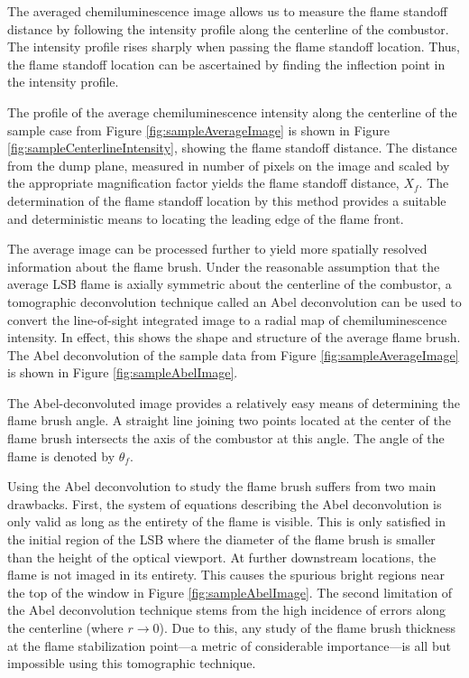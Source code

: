 The averaged chemiluminescence image allows us to measure the flame standoff distance by following the intensity profile along the centerline of the combustor.
The intensity profile rises sharply when passing the flame standoff location.
Thus, the flame standoff location can be ascertained by finding the inflection point in the intensity profile.

The profile of the average chemiluminescence intensity along the centerline of the sample case from Figure \ref{fig:sampleAverageImage} is shown in Figure \ref{fig:sampleCenterlineIntensity}, showing the flame standoff distance.
The distance from the dump plane, measured in number of pixels on the image and scaled by the appropriate magnification factor yields the flame standoff distance, \(X_f\).
The determination of the flame standoff location by this method provides a suitable and deterministic means to locating the leading edge of the flame front.

The average image can be processed further to yield more spatially resolved information about the flame brush.
Under the reasonable assumption that the average LSB flame is axially symmetric about the centerline of the combustor, a tomographic deconvolution technique called an Abel deconvolution\cite{1992-dasch} can be used to convert the line-of-sight integrated image to a radial map of chemiluminescence intensity.
In effect, this shows the shape and structure of the average flame brush.
The Abel deconvolution of the sample data from Figure \ref{fig:sampleAverageImage} is shown in Figure \ref{fig:sampleAbelImage}.

The Abel-deconvoluted image provides a relatively easy means of determining the flame brush angle.
A straight line joining two points located at the center of the flame brush intersects the axis of the combustor at this angle.
The angle of the flame is denoted by \(\theta_f\).

Using the Abel deconvolution to study the flame brush suffers from two main drawbacks.
First, the system of equations describing the Abel deconvolution is only valid as long as the entirety of the flame is visible.
This is only satisfied in the initial region of the LSB where the diameter of the flame brush is smaller than the height of the optical viewport.
At further downstream locations, the flame is not imaged in its entirety.
This causes the spurious bright regions near the top of the window in Figure \ref{fig:sampleAbelImage}.
The second limitation of the Abel deconvolution technique stems from the high incidence of errors along the centerline (where \(r \to 0\)).
Due to this, any study of the flame brush thickness at the flame stabilization point---a metric of considerable importance---is all but impossible using this tomographic technique.

